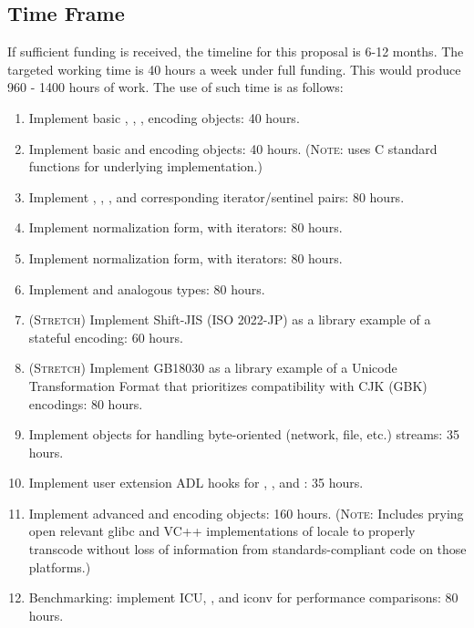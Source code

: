 \documentclass{wg21}
\begin{document}
\subsection[time frame]{Time Frame}

If sufficient funding is received, the timeline for this proposal is 6-12 months. The targeted working time is 40 hours a week under full funding. This would produce 960 - 1400 hours of work. The use of such time is as follows:

\begin{enumerate}
	\item Implement basic , , ,  encoding objects: 40 hours.
	\item Implement basic  and  encoding objects: 40 hours. (\textsc{Note}: uses C standard functions for underlying implementation.)
	\item Implement , , , and corresponding iterator/sentinel pairs: 80 hours.
	\item Implement  normalization form, with iterators: 80 hours.
	\item Implement  normalization form, with iterators: 80 hours.
	\item Implement  and  analogous types: 80 hours.
	\item (\textsc{Stretch}) Implement Shift-JIS (ISO 2022-JP) as a library example of a stateful encoding: 60 hours.
	\item (\textsc{Stretch}) Implement GB18030 as a library example of a Unicode Transformation Format that prioritizes compatibility with CJK (GBK) encodings: 80 hours.
	\item Implement  objects for handling byte-oriented (network, file, etc.) streams: 35 hours.
	\item Implement user extension ADL hooks for , ,  and  : 35 hours.
	\item Implement advanced  and  encoding objects: 160 hours. (\textsc{Note}: Includes prying open relevant glibc and VC++ implementations of locale to properly transcode without loss of information from standards-compliant code on those platforms.)
	\item Benchmarking: implement ICU\cite{icu}, \cite{encoding_rs}, and iconv\cite{iconv} for performance comparisons: 80 hours.

\end{enumerate}
\end{document}
